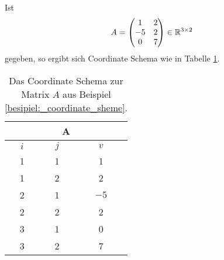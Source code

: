 \begin{bsp}
    \label{besipiel:_coordinate_sheme}
    Ist
    \begin{equation*}
        A=\begin{pmatrix}
            1 & 2 \\
            -5 & 2 \\
            0 & 7 \\
        \end{pmatrix}
        \in \mathbb{R}^{3 \times 2}
    \end{equation*}
    gegeben, so ergibt sich Coordinate Schema wie in Tabelle \ref{coordinate_scheme_table}.

\begin{table}
    \centering
    \begin{tabular}{|c|c|c|} 
        \hline
    \multicolumn{3}{|c|}{\textbf{A}} \\ \hline
     \hline
     $i$ &$j$ &$v$ \\ 
     \hline
     1 &1 &1\\ 
     \hline
     1 &2 &2\\
     \hline
     2 &1 &$-5$\\
     \hline
     2 &2 &2\\
     \hline
     3 &1 &0\\
     \hline
     3 &2 &7\\
     \hline
    \end{tabular}
    \caption[Das Coordinate-Schema]{Das Coordinate Schema zur Matrix $A$ aus Beispiel \ref{besipiel:_coordinate_sheme}.}
    \label{coordinate_scheme_table}
\end{table}
\end{bsp}

